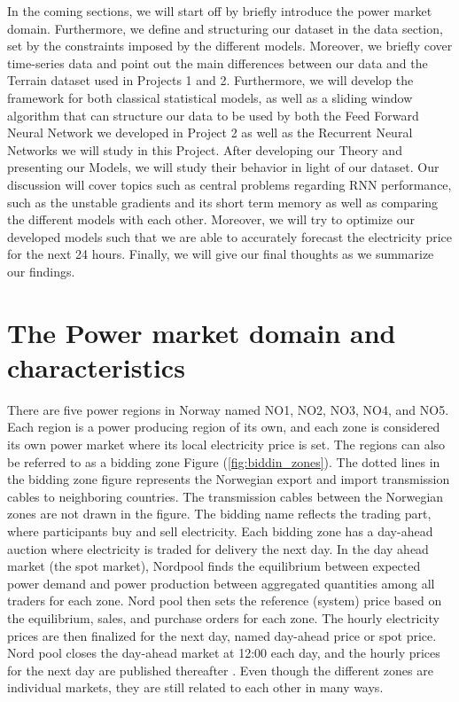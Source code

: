 \documentclass
[twocolumn,
secnumarabic,
nobibnotes,
aps,
prl,
reprint,
groupedaddress,
amsmath,
amssymb,
]{revtex4-2}
\begin{document}
In the coming sections, we will start off by briefly introduce the power market domain. Furthermore, we define and structuring our dataset in the data section, set by the constraints imposed by the different models. Moreover, we briefly cover time-series data and point out the main differences between our data and the Terrain dataset used in Projects 1 and 2. Furthermore, we will develop the framework for both classical statistical models, as well as a sliding window algorithm that can structure our data to be used by both the Feed Forward Neural Network we developed in Project 2 as well as the Recurrent Neural Networks we will study in this Project. After developing our Theory and presenting our Models, we will study their behavior in light of our dataset. Our discussion will cover topics such as central problems regarding RNN performance, such as the unstable gradients and its short term memory as well as comparing the different models with each other. Moreover, we will try to optimize our developed models such that we are able to accurately forecast the electricity price for the next 24 hours. Finally, we will give our final thoughts as we summarize our findings.

\section{The Power market domain and characteristics}
There are five power regions in Norway named NO1, NO2, NO3, NO4, and NO5. Each region is a power producing region of its own, and each zone is considered its own power market where its local electricity price is set. The regions can also be referred to as a bidding zone Figure (\ref{fig:biddin_zones}). The dotted lines in the bidding zone figure represents the Norwegian export and import transmission cables to neighboring countries. The transmission cables between the Norwegian zones are not drawn in the figure. The bidding name reflects the trading part, where participants buy and sell electricity. Each bidding zone has a day-ahead auction where electricity is traded for delivery the next day. In the day ahead market (the spot market), Nordpool finds the equilibrium between expected power demand and power production between aggregated quantities among all traders for each zone. Nord pool then sets the reference (system) price based on the equilibrium, sales, and purchase orders for each zone. The hourly electricity prices are then finalized for the next day, named day-ahead price or spot price. Nord pool closes the day-ahead market at 12:00 each day, and the hourly prices for the next day are published thereafter \cite{nordpool}. Even though the different zones are individual markets, they are still related to each other in many ways. 
\end{document}
